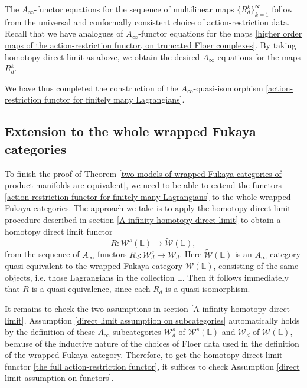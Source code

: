 \documentclass{amsart}
\numberwithin{equation}{section}
\numberwithin{figure}{section}
\begin{document}
	The $A_{\infty}$-functor equations for the sequence of multilinear maps $\{R_{d}^{k}\}_{k=1}^{\infty}$ follow from the universal and conformally consistent choice of action-restriction data. Recall that we have analogues of $A_{\infty}$-functor equations for the maps \eqref{higher order maps of the action-restriction functor, on truncated Floer complexes}. By taking homotopy direct limit as above, we obtain the desired $A_{\infty}$-equations for the maps $R_{d}^{k}$. \par
	 We have thus completed the construction of the $A_{\infty}$-quasi-isomorphism \eqref{action-restriction functor for finitely many Lagrangians}. \par

\subsection{Extension to the whole wrapped Fukaya categories}
	To finish the proof of Theorem \ref{two models of wrapped Fukaya categories of product manifolds are equivalent}, we need to be able to extend the functors \eqref{action-restriction functor for finitely many Lagrangians} to the whole wrapped Fukaya categories. The approach we take is to apply the homotopy direct limit procedure described in section \ref{A-infinity homotopy direct limit} to obtain a homotopy direct limit functor
\begin{equation} \label{the full action-restriction functor}
R: \mathcal{W}^{s}(\mathbb{L}) \to \tilde{\mathcal{W}}(\mathbb{L}),
\end{equation}
from the sequence of $A_{\infty}$-functors $R_{d}: \mathcal{W}_{d}^{s} \to \mathcal{W}_{d}$. Here $\tilde{\mathcal{W}}(\mathbb{L})$ is an $A_{\infty}$-category quasi-equivalent to the wrapped Fukaya category $\mathcal{W}(\mathbb{L})$, consisting of the same objects, i.e. those Lagrangians in the collection $\mathbb{L}$. Then it follows immediately that $R$ is a quasi-equivalence, since each $R_{d}$ is a quasi-isomorphism. \par
	It remains to check the two assumptions in section \ref{A-infinity homotopy direct limit}. Assumption \eqref{direct limit assumption on subcategories} automatically holds by the definition of these $A_{\infty}$-subcategories $\mathcal{W}^{s}_{d}$ of $\mathcal{W}^{s}(\mathbb{L})$ and $\mathcal{W}_{d}$ of $\mathcal{W}(\mathbb{L})$, because of the inductive nature of the choices of Floer data used in the definition of the wrapped Fukaya category. Therefore, to get the homotopy direct limit functor \eqref{the full action-restriction functor}, it suffices to check Assumption \ref{direct limit assumption on functors}. \par
\end{document}
